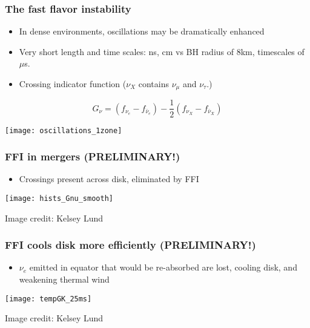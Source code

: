 \documentclass[]{beamer}
\begin{document}
\begin{frame}
  \frametitle{The fast flavor instability}
  \begin{itemize}
  \item In dense environments, oscillations may be dramatically enhanced
  \item Very short length and time scales: ns, cm vs BH radius of 8km,
    timescales of $\mu$s.
  \item Crossing indicator function ($\nu_X$ contains $\nu_\mu$ and $\nu_\tau$.)
  \end{itemize}
    $$G_\nu = (f_{\nu_e} - f_{\bar{\nu}_e}) - \frac{1}{2}(f_{\nu_X} - f_{\bar{\nu}_{X}})$$
    \begin{center}
      \texttt{[image: oscillations\_1zone]}
    \end{center}
\end{frame}

\begin{frame}
  \frametitle{FFI in mergers (PRELIMINARY!)}
  \begin{itemize}
  \item Crossings present across disk, eliminated by FFI
  \end{itemize}
  \begin{center}
    \texttt{[image: hists\_Gnu\_smooth]}
  \end{center}
  Image credit: Kelsey Lund
\end{frame}

\begin{frame}
  \frametitle{FFI cools disk more efficiently (PRELIMINARY!)}
  \begin{itemize}
  \item $\nu_e$ emitted in equator that would be re-absorbed are lost,
    cooling disk, and weakening thermal wind
  \end{itemize}
  \begin{center}
    \texttt{[image: tempGK\_25ms]}
  \end{center}
  Image credit: Kelsey Lund
\end{frame}
\end{document}

